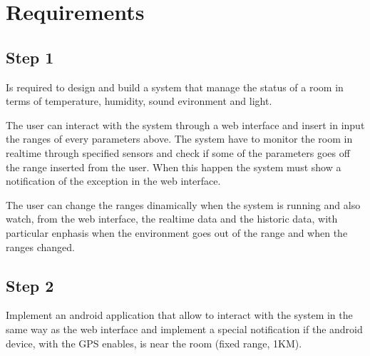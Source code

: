\section{Requirements}

\subsection{Step 1}

Is required to design and build a system that manage the status of a room in terms of temperature, humidity, sound evironment and light.

The user can interact with the system through a web interface and insert in input the ranges of every parameters above. The system have to monitor the room in realtime through specified sensors and check if some of the parameters goes off the range inserted from the user. When this happen the system must show a notification of the exception in the web interface.

The user can change the ranges dinamically when the system is running and also watch, from the web interface, the realtime data and the historic data, with particular enphasis when the environment goes out of the range and when the ranges changed.

\subsection{Step 2}

Implement an android application that allow to interact with the system in the same way as the web interface and implement a special notification if the android device, with the GPS enables, is near the room (fixed range, 1KM).
